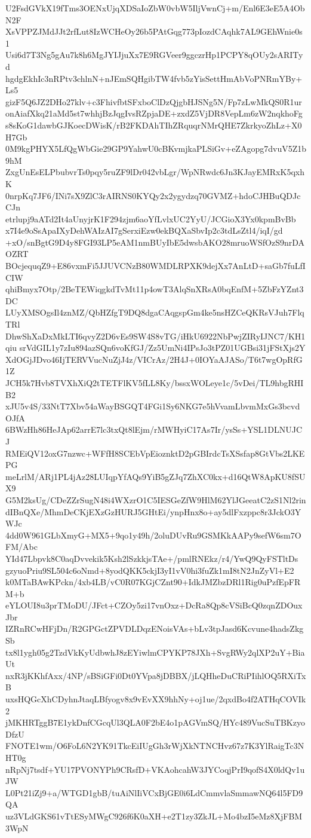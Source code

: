 U2FsdGVkX19fTms3OENxUjqXDSaIoZbW0vbW5IljVwnCj+m/Enl6E3eE5A4ObN2F
XsVPPZJMdJJt2rfLut8IzWCHeOy26b5PAtGqg773pIozdCAqhk7AL9GEhWnie0s1
Usi6d7T3Ng5gAu7k8h6MgJYIJjuXx7E9RGVeer9ggczrHp1PCPY8qOUy2sARITyd
hgdgEkhIc3nRPtv3chlnN+nJEmSQHgibTW4fvb5zYisSettHmAbVoPNRmYBy+Ls5
gizF5Q6JZ2DHo27klv+c3FhivfbtSFxboClDzQjgbHJSNg5N/Fp7zLwMkQS0R1ur
onAiafXkq21aMd5st7whhjBzJqgIvsRZpjaDE+zxdZ5VjDR8VepLm6zW2nqkhoFg
s8sKoG1dawbGJKoecDWisK/rB2FKDAhTIhZRquqrNMrQHE7ZkrkyoZhLz+X0H7Gb
0M9kgPHYX5LfQgWbGie29GP9YahwU0cBKvmjkaPLSiGv+eZAgopg7dvuV5Z1b9hM
ZxgUnEsELPbubvrTs0pqy5ruZF9lDr042vbLgr/WpNRwdc6Jn3KJayEMRxK5qxhK
0nrpKq7JF6/INi7sX9ZlC3rAIRNS0KYQy2x2ygydzq70GVMZ+hdoCJHBuQDJcCJn
etrlupj9aATd2It4aUnyjrK1F294zjm6aoYfLvlxUC2YyU/JCGioX3Yx0kpmBvBb
x7I4e9oSsApaIXyDehWAIzAI7gSerxiEzw0ekBQXaSbvIp2c3tdLsZtl4/iqI/gd
+xO/snBgtG9D4y8FGI93LP5eAM1nmBUyIbE5dwsbAKO28mruoWSfOzS9nrDAOZRT
BOcjequqZ9+E86vxmFi5JJUVCNzB80WMDLRPXK9dejXx7AnLtD+saGb7fuLfICIW
qhiBmyx7Otp/2BeTEWiqgkdTvMt11p4owT3AlqSnXRsA0bqEnfM+5ZbFzYZnt3DC
LUyXMSOgsIl4znMZ/QbHZfgT9DQ8dgaCAqgspGm4ke5nsHZCeQKRsVJuh7FlqTRl
DhwShXaDxMkLTI6qvyZ2D6vEs9SW4S8vTG/iHkU6922NbPwjZIRyIJNC7/KH1qiu
srVdGIL1y7zIu894azSQn6voKfGJ/Zz5UmNi4IPsJo3tPZ01UGBsi31jFStXjs2Y
XdOGjJDvo46IjTERVVucNuZjJ4z/VICrAz/2H4J+0IOYaAJASo/T6t7wgOpRfG1Z
JCH5k7Hvb8TVXhXiQ2tTETFlKV5fLL8Ky/bssxWOLeye1c/5vDei/TL9hbgRHIB2
xJU5v4S/33NtT7Xbv54aWayBSGQT4FGi1Sy6NKG7e5hVvamLbvmMxGs3bcvdOJfA
6BWzHh86HeJAp62arrE7lc3txQt8lEjm/rMWHyiC17As7Ir/ysSs+YSL1DLNUJCJ
RMEiQV12oxG7nzwc+WFfH8SCEbVpEioznktD2pGBIrdcTsXSsfap8GtVbs2LKEPG
meLrlM/ARj1PL4jAz28LUIqpYfAQs9YiB5gZJq7ZhXC0kx+d16QtW8ApKU8fSUX9
G5M2ksUg/CDeZZrSugN48i4WXzrO1C5IESGeZfW9HlM62YlJGeeatC2zS1Nl2rin
dIBnQXe/MhmDeCKjEXzGzHURJ5GHtEi/ynpHnx8o+ay5dlFxzppc8r3JckO3YWJc
4dd0W961GLbXmyG+MX5+9qo1y49h/2oluDUvRu9GSMKkAAPy9sefW6sm7OFM/Abc
YId47Lbpvk8C0aqDvvekik5Ksh2lSzkkjsTAe+/pmlRNEkz/r4/YwQ9QyFSTltDs
gzyuoPriu9SL504c6oNmd+8yodQKK5ckjI3yI1vV0hi3fuZk1mI8tN2JnZyVl+E2
k0MTaBAwKPckn/4xb4LB/vC0R07KGjCZnt90+IdkJMZbzDRl1Rig0uPzfEpFRM+b
eYLOUI8u3prTMoDU/JFct+CZOy5zi17vnOxz+DcRa8Qp8cVSiBcQ0zqnZDOuxJbr
IZRnRCwHFjDn/R2GPGctZPVDLDqzENoisVAs+bLv3tpJasd6Kcvune4hadsZkgSb
tx8l1ygh05g2TzdVkKyUdbwhJ8zEYiwlmCPYKP78JXh+SvgRWy2qlXP2uY+BiaUt
nxR3jKKhfAxx/4NP/sBSiGFi0Dt0YVpa8jDBBX/jLQHheDuCRiPIihlOQ5RXiTxB
uxsHQGcXhCDyhnJtaqLBfyogv8x9vEvXX9hhNy+oj1ue/2qxdBo4f2ATHqCOVIk2
jMKHRTggB7E1ykDnfCGcqUl3QLA0F2bE4o1pAGVmSQ/HYc489VucSuTBKzyoDfzU
FNOTE1wm/O6FoL6N2YK91TkcEiIUgGh3rWjXkNTNCHvz67z7K3YlRaigTc3NHT0g
nRpNj7tsdf+YU17PVONYPh9CRsfD+VKAohcahW3JYCoqjPrI9qofS4X0ldQv1uJW
L0Pt21iZj9+a/WTGD1gbB/tuAiNlIiVCxBjGE0i6LdCmmvlaSmmawNQ64l5FD9QA
uz3VLdGKS61vTtESyMWgC926f6K0aXH+e2T1zy3ZkJL+Mo4bzI5eMz8XjFBM3WpN
